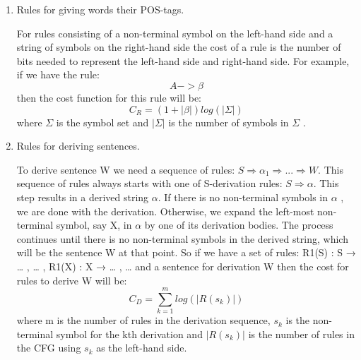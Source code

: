 \documentclass[paper=a4, fontsize=11pt]{scrartcl} %
\numberwithin{equation}{section} %
\numberwithin{figure}{section} %
\numberwithin{table}{section} %
\begin{document}
\begin{enumerate}[1.]
\item Rules for giving words their POS-tags.

For rules consisting of a non-terminal symbol on the left-hand side and a string of symbols on the right-hand side the cost of a rule is the number of bits needed to represent the left-hand side and right-hand side. For example, if we have the rule:
\begin{equation}\label{first}
A  -> \beta
\end{equation}
then the cost function for this rule will be:
\begin{equation}\label{first}
C_R = (1+\lvert\beta\rvert)log(\lvert\Sigma\rvert)
\end{equation}
where \begin{math} \Sigma \end{math}  is the symbol set and \begin{math} \lvert\Sigma\rvert \end{math} is the number of symbols in \begin{math} \Sigma \end{math} .
\item Rules for deriving sentences.

To derive sentence W we need a sequence of rules: \begin{math} S \Rightarrow \alpha_1 \Rightarrow ... \Rightarrow W \end{math}. This sequence of rules always starts with one of S-derivation rules: \begin{math} S \Rightarrow \alpha \end{math}. This step results in a derived string \begin{math} \alpha \end{math}. If there is no non-terminal symbols in \begin{math} \alpha \end{math} , we are done with the derivation. Otherwise, we expand the left-most non-terminal symbol, say X, in \begin{math} \alpha \end{math} by one of its derivation bodies. The process continues until there is no non-terminal symbols in the derived string, which will be the sentence W at that point.
So if we have a set of rules: R1(S) : S → … , … , R1(X) : X → … , … and a sentence for derivation W then the cost for rules to derive W will be:
\begin{equation}\label{first}
C_D = \sum \limits_{k=1}^m log(\lvert R(s_k)\rvert)
\end{equation}
where m is the number of rules in the derivation sequence, \begin{math} s_k \end{math} is the non-terminal symbol for the kth derivation and \begin{math} \lvert R(s_k)\rvert \end{math} is the number of rules in the CFG using \begin{math} s_k \end{math} as the left-hand side.
\end{enumerate}
\end{document}
